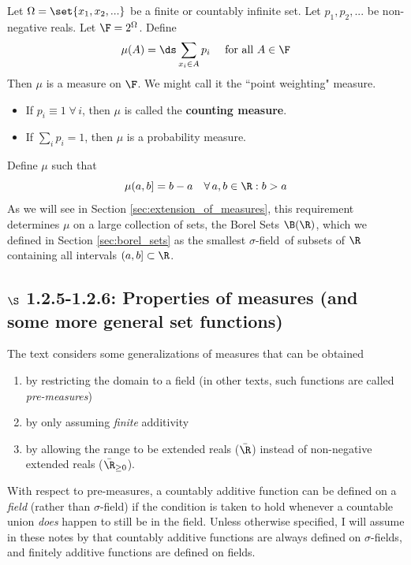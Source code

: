\documentclass{article} %
\renewcommand{\sf}{$\sigma$-field}
\newcommand{\sfs}{$\sigma$-fields}
\begin{document}
\begin{example}
Let $\Omega = \set{x_1,x_2,...}$ be a finite or countably infinite set.  Let $p_1, p_2,...$ be non-negative reals.  Let $\F = 2^\Omega$.  Define
\[\mu(A) = \ds\sum_{x_i \in A} p_i \quad \text{ for all } A \in \F\]
Then $\mu$ is a measure on $\F$. We might call it the ``point weighting" measure. 
\begin{itemize}
\item If $p_i \equiv 1 \; \forall \, i$, then $\mu$ is called the \textbf{counting measure}.
\item If $\sum_i p_i =1$, then $\mu$ is a probability measure.	
\end{itemize}
	
\end{example}


\begin{example}{}
Define $\mu$ such that 
\[ \mu(a,b] = b-a \quad \forall \, a,b \in \R : b>a \]
As we will see in Section \ref{sec:extension_of_measures}, this requirement determines $\mu$ on a large collection of sets, the Borel Sets $\B(\R)$, which we defined in Section \ref{sec:borel_sets} as the smallest \sf\ of subsets of $\R$ containing all intervals $(a,b] \subset \R$. 
\label{ex:lesbesgue_measure}
\end{example}


\subsection{$\S$ 1.2.5-1.2.6: Properties of measures (and some more general set functions)}

The text considers some generalizations of measures that can be obtained
\begin{enumerate}
\item  by restricting the domain to a field {\footnotesize (in other texts, such functions are called \textit{pre-measures}) }
\item  by only assuming \textit{finite} additivity 
\item by allowing the range to be extended reals ($\bar{\R}$) instead of non-negative extended reals ($\bar{\R}_{\geq 0}$).  
\end{enumerate}



\begin{remark}
With respect to pre-measures, a countably additive function can be defined on a \textit{field} (rather than \sf) if the condition is taken to hold whenever a countable union \textit{does} happen to still be in the field.  Unless otherwise specified, I will assume in these notes by that countably additive functions are always defined on \sfs, and finitely additive functions are defined on fields.
\label{rk:i_am_assuming_a_domain_based_on_the_type_of_additivity}
\end{remark}	
\end{document}
